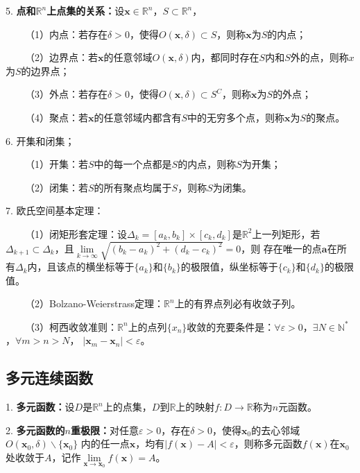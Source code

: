 5. \textbf{点和$\mathbb{R}^n$上点集的关系：}设$\boldsymbol{x}\in \mathbb{R}^n$，$S\subset \mathbb{R}^n$，

~~~~（1）内点：若存在$\delta>0$，使得$O(\boldsymbol{x},\delta)\subset S$，则称$\boldsymbol{x}$为$S$的内点；

~~~~（2）边界点：若$\boldsymbol{x}$的任意邻域$O(\boldsymbol{x},\delta)$内，都同时存在$S$内和$S$外的点，则称$x$为$S$的边界点；

~~~~（3）外点：若存在$\delta>0$，使得$O(\boldsymbol{x},\delta)\subset S^C$，则称$\boldsymbol{x}$为$S$的外点；

~~~~（4）聚点：若$\boldsymbol{x}$的任意邻域内都含有$S$中的无穷多个点，则称$\boldsymbol{x}$为$S$的聚点。

6. 开集和闭集；

~~~~（1）开集：若$S$中的每一个点都是$S$的内点，则称$S$为开集；

~~~~（2）闭集：若$S$的所有聚点均属于$S$，则称$S$为闭集。

7. 欧氏空间基本定理：

~~~~（1）闭矩形套定理：设$\Delta_k=[a_k,b_k]\times [c_k,d_k]$是$\mathbb{R}^2$上一列矩形，若$\Delta_{k+1}\subset \Delta_k$，且$\lim\limits_{k\rightarrow\infty}\sqrt{(b_k-a_k)^2+(d_k-c_k)^2}=0$，则
存在唯一的点$\boldsymbol{a}$在所有$\Delta_k$内，且该点的横坐标等于$\{a_k\}$和$\{b_k\}$的极限值，纵坐标等于$\{c_k\}$和$\{d_k\}$的极限值。

~~~~（2）Bolzano-Weierstrass定理：$\mathbb{R}^n$上的有界点列必有收敛子列。

~~~~（3）柯西收敛准则：$\mathbb{R}^n$上的点列$\{x_n\}$收敛的充要条件是：$\forall \varepsilon>0$，$\exists N \in \mathbb{N}^*$，$\forall m>n>N$，
$|\boldsymbol{x}_m-\boldsymbol{x}_n|<\varepsilon$。

\subsection{多元连续函数}

1. \textbf{多元函数：}设$D$是$\mathbb{R}^n$上的点集，$D$到$\mathbb{R}$上的映射$f:D\rightarrow \mathbb{R}$称为$n$元函数。

2. \textbf{多元函数的$n$重极限：}对任意$\varepsilon>0$，存在$\delta>0$，使得$\boldsymbol{x}_0$的去心邻域$O(\boldsymbol{x}_0,\delta)\backslash \{\boldsymbol{x}_0\}$
内的任一点$\boldsymbol{x}$，均有$|f(\boldsymbol{x})-A|<\varepsilon$，则称多元函数$f(\boldsymbol{x})$在$\boldsymbol{x}_0$处收敛于$A$，记作$\lim\limits_{\boldsymbol{x}\rightarrow\boldsymbol{x}_0}f(\boldsymbol{x})=A$。

